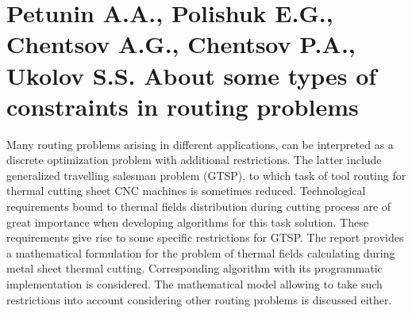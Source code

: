 \section*{Petunin A.A., Polishuk E.G., Chentsov A.G., Chentsov P.A., Ukolov S.S.
About some types of constraints in routing problems}

Many routing problems arising in different applications,
can be interpreted as a discrete optimization problem with additional restrictions.
The latter include generalized travelling salesman problem (GTSP),
to which task of tool routing for thermal cutting sheet CNC machines
is sometimes reduced.
Technological requirements bound to thermal fields distribution
during cutting process are of great importance
when developing algorithms for this task solution.
These requirements give rise to some specific restrictions for GTSP.
The report provides a mathematical formulation
for the problem of thermal fields calculating
during metal sheet thermal cutting.
Corresponding algorithm with its programmatic implementation is considered.
The mathematical model allowing to take such restrictions into account
considering other routing problems is discussed either.
